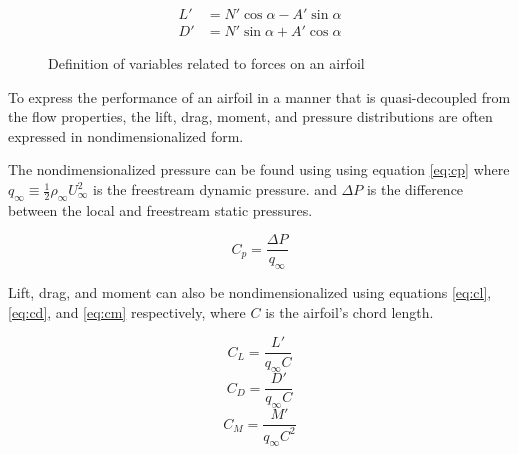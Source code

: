 \documentclass[runningheads]{llncs}
\begin{document}
\begin{align}
    L' &= N'\cos\alpha - A'\sin\alpha \label{eq:lift} \\
    D' &= N'\sin\alpha + A'\cos\alpha \label{eq:drag}
\end{align}

\begin{figure}
    \centering
    \caption{Definition of variables related to forces on an airfoil}
    \label{fig:airfoil_directions}
\end{figure}

\noindent
To express the performance of an airfoil in a manner that is quasi-decoupled from the flow properties, the lift, drag, moment, and pressure distributions are often expressed in nondimensionalized form.

\noindent
The nondimensionalized pressure can be found using using equation \ref{eq:cp} where $q_\infty\equiv\frac{1}{2}\rho_\infty U_\infty^2$ is the freestream dynamic pressure. and $\Delta P$ is the difference between the local and freestream static pressures.\newline

\begin{equation}
    C_p = \frac{\Delta P}{q_\infty}
    \label{eq:cp}
\end{equation}

\noindent
Lift, drag, and moment can also be nondimensionalized using equations \ref{eq:cl}, \ref{eq:cd}, and \ref{eq:cm} respectively, where $C$ is the airfoil's chord length.\newline

\begin{multicols}{3}
\begin{equation}
    C_L = \frac{L'}{q_\infty C}
    \label{eq:cl}
\end{equation}
\begin{equation}
    C_D = \frac{D'}{q_\infty C}
    \label{eq:cd}
\end{equation}
\begin{equation}
    C_M = \frac{M'}{q_\infty C^2}
    \label{eq:cm}
\end{equation}
\end{multicols}
\end{document}
